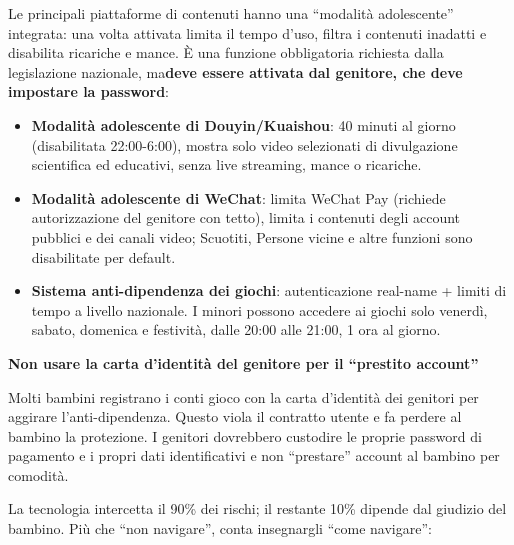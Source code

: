 Le principali piattaforme di contenuti hanno una “modalità adolescente” integrata: una volta attivata limita il tempo d'uso, filtra i contenuti inadatti e disabilita ricariche e mance. È una funzione obbligatoria richiesta dalla legislazione nazionale, ma\textbf{deve essere attivata dal genitore, che deve impostare la password}:

\begin{itemize}
  \item \textbf{Modalità adolescente di Douyin/Kuaishou}: 40 minuti al giorno (disabilitata 22:00-6:00), mostra solo video selezionati di divulgazione scientifica ed educativi, senza live streaming, mance o ricariche.
  \item \textbf{Modalità adolescente di WeChat}: limita WeChat Pay (richiede autorizzazione del genitore con tetto), limita i contenuti degli account pubblici e dei canali video; Scuotiti, Persone vicine e altre funzioni sono disabilitate per default.
  \item \textbf{Sistema anti-dipendenza dei giochi}: autenticazione real-name + limiti di tempo a livello nazionale. I minori possono accedere ai giochi solo venerdì, sabato, domenica e festività, dalle 20:00 alle 21:00, 1 ora al giorno.
\end{itemize}

\textbf{Non usare la carta d'identità del genitore per il “prestito account”}\par

Molti bambini registrano i conti gioco con la carta d'identità dei genitori per aggirare l'anti-dipendenza. Questo viola il contratto utente e fa perdere al bambino la protezione. I genitori dovrebbero custodire le proprie password di pagamento e i propri dati identificativi e non “prestare” account al bambino per comodità.


La tecnologia intercetta il 90\% dei rischi; il restante 10\% dipende dal giudizio del bambino. Più che “non navigare”, conta insegnargli “come navigare”:

